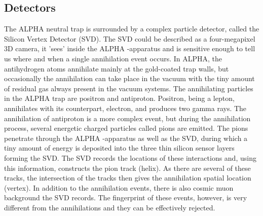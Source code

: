 \documentclass{article}
\begin{document}
\subsection{Detectors}
The ALPHA neutral trap is surrounded by a complex particle detector, called the Silicon Vertex Detector (SVD). The SVD could be described as a four-megapixel 3D camera, it 'sees' inside the ALPHA -apparatus and is sensitive enough to tell us where and when a single annihilation event occurs. In ALPHA, the antihydrogen atoms annihilate mainly at the gold-coated trap walls, but occasionally the annihilation can take place in the vacuum with the tiny amount of residual gas always present in the vacuum systems. The annihilating particles in the ALPHA trap are positron and antiproton. Positron, being a lepton, annihilates with its counterpart, electron, and produces two gamma rays. The annihilation of antiproton is a more complex event, but during the annihilation process, several energetic charged particles called pions are emitted. The pions penetrate through the ALPHA -apparatus as well as the SVD, during which a tiny amount of energy is deposited into the three thin silicon sensor layers forming the SVD. The SVD records the locations of these interactions and, using this information, constructs the pion track (helix). As there are several of these tracks, the intersection of the tracks then gives the annihilation spatial location (vertex). In addition to the annihilation events, there is also cosmic muon background the SVD records. The fingerprint of these events, however, is very different from the annihilations and they can be effectively rejected.
\end{document}
